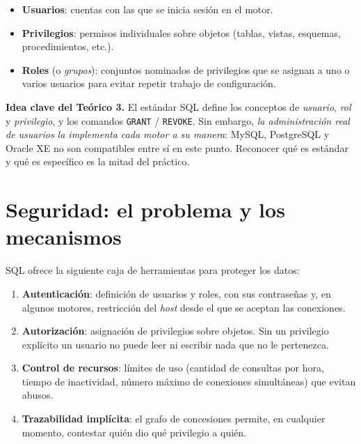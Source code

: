 \documentclass[11pt,a4paper]{article}
\begin{document}
\begin{itemize}
    \item \textbf{Usuarios}: cuentas con las que se inicia sesión en el motor.
    \item \textbf{Privilegios}: permisos individuales sobre objetos
    (tablas, vistas, esquemas, procedimientos, etc.).
    \item \textbf{Roles} (o \emph{grupos}): conjuntos nominados de
    privilegios que se asignan a uno o varios usuarios para evitar
    repetir trabajo de configuración.
\end{itemize}

\begin{nota}
\textbf{Idea clave del Teórico 3.} El estándar SQL define los conceptos de
\emph{usuario}, \emph{rol} y \emph{privilegio}, y los comandos
\texttt{GRANT} / \texttt{REVOKE}. Sin embargo, \emph{la administración
real de usuarios la implementa cada motor a su manera}: MySQL, PostgreSQL
y Oracle XE no son compatibles entre sí en este punto. Reconocer qué es
estándar y qué es específico es la mitad del práctico.
\end{nota}

\section{Seguridad: el problema y los mecanismos}

SQL ofrece la siguiente caja de herramientas para proteger los datos:

\begin{enumerate}
    \item \textbf{Autenticación}: definición de usuarios y roles, con
    sus contraseñas y, en algunos motores, restricción del \emph{host}
    desde el que se aceptan las conexiones.
    \item \textbf{Autorización}: asignación de privilegios sobre objetos.
    Sin un privilegio explícito un usuario no puede leer ni escribir
    nada que no le pertenezca.
    \item \textbf{Control de recursos}: límites de uso (cantidad de
    consultas por hora, tiempo de inactividad, número máximo de
    conexiones simultáneas) que evitan abusos.
    \item \textbf{Trazabilidad implícita}: el grafo de concesiones
    permite, en cualquier momento, contestar quién dio qué privilegio
    a quién.
\end{enumerate}
\end{document}
